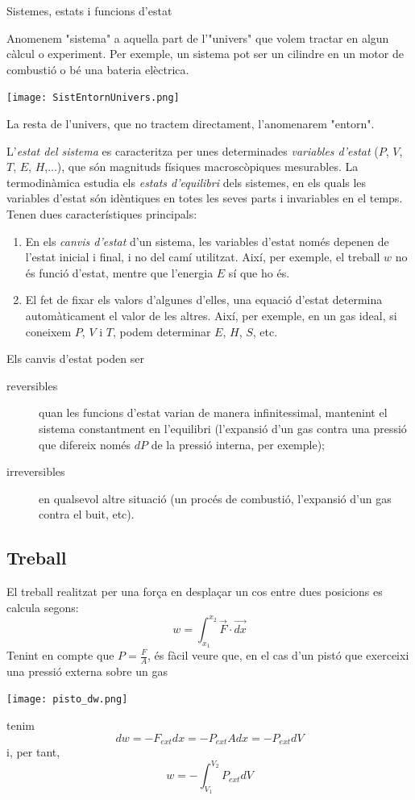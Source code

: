 \begin{mybox}{Sistemes, estats i funcions d'estat}

    Anomenem "sistema" a aquella part de l'"univers" que volem tractar en algun càlcul o experiment. 
Per exemple, un sistema pot ser un cilindre en un motor de combustió o bé una bateria elèctrica.
\begin{center}
\texttt{[image: SistEntornUnivers.png]}
\end{center}
La resta de l'univers, que no tractem directament, l'anomenarem "entorn".

L'\textit{estat del sistema} es caracteritza  per unes determinades \textit{variables d'estat} ($P$, $V$, $T$, $E$, $H$,...), que són magnituds físiques macroscòpiques mesurables. La termodinàmica estudia els \textit{estats d'equilibri} dels sistemes, en els quals les variables d'estat són idèntiques en totes les seves parts i invariables en el temps.
Tenen dues característiques principals:
\begin{enumerate}
\item En els \textit{canvis d'estat} d'un sistema, les variables d'estat només depenen de l'estat inicial i final, i no del camí utilitzat. Així, per exemple, el treball $w$ no és funció d'estat, mentre que l'energia $E$ sí que ho és.
\item El fet de fixar els valors d'algunes d'elles, una equació d'estat determina automàticament el valor de les altres. Així, per exemple, en un gas ideal, si coneixem $P$, $V$ i $T$, podem determinar $E$, $H$, $S$, etc.
\end{enumerate}

Els canvis d'estat poden ser 
\begin{description}
\item[reversibles] quan les funcions d'estat varian de manera infinitessimal, mantenint el sistema constantment en l'equilibri (l'expansió d'un gas contra una pressió que difereix només $dP$ de la pressió interna, per exemple);
\item[irreversibles] en qualsevol altre situació (un procés de combustió, l'expansió d'un gas contra el buit, etc).
\end{description}
\end{mybox}

\subsection{Treball}

El treball realitzat per una força en desplaçar un cos entre dues posicions es calcula segons:
\[
w=\int_{x_1}^{x_2} \vec{F} \cdot \vec{dx}
\]
Tenint en compte que $P=\frac{F}{A}$, és fàcil veure que, en el cas d'un pistó que exerceixi una pressió externa sobre un gas 
\begin{center}
\texttt{[image: pisto\_dw.png]}
\end{center}
tenim
\[
dw=-F_{ext}dx = -P_{ext} A dx = -P_{ext} dV
\]
i, per tant,
\[
w=-\int_{V_1}^{V_2} P_{ext} dV
\]
